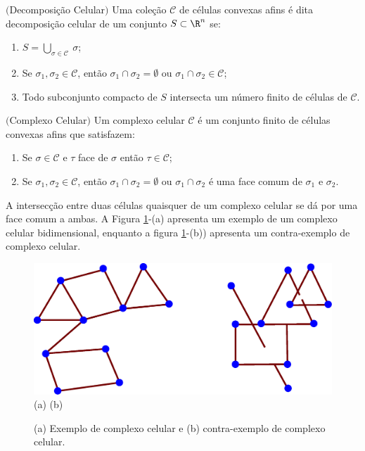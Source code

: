 \begin{defi} $($Decomposição Celular$)$
Uma cole\c c\~ao $\mathcal{C}$ de c\'elulas convexas afins 
\'e dita decomposi\c c\~ao celular de um conjunto $S \subset  \R^{n}$ se:
\begin{enumerate}
\item $S = \bigcup_{\sigma \in \mathcal{C}}\ \sigma$;
\item Se $\sigma_{1},\sigma_{2} \in \mathcal{C}$, ent\~ao $\sigma_{1} \cap \sigma_{2} = 
         \emptyset$ ou $\sigma_{1} \cap \sigma_{2} \in \mathcal{C}$;
\item Todo subconjunto compacto de $S$ intersecta um n\'umero finito de
      c\'elulas de $\mathcal{C}$. 
\end{enumerate}
\end{defi}

\begin{defi} $($Complexo Celular$)$
Um complexo celular $\mathcal{C}$ é um conjunto finito de células convexas afins que satisfazem: 
\begin{enumerate}
\item Se $\sigma \in \mathcal{C}$ e $\tau$ face de $\sigma$ então $\tau \in \mathcal{C}$;
\item Se $\sigma_{1},\sigma_{2} \in \mathcal{C}$, ent\~ao $\sigma_{1} \cap \sigma_{2} = \emptyset$ ou $\sigma_{1} \cap \sigma_{2}$ é uma face comum de $\sigma_1$ e $\sigma_2$.
\end{enumerate}
\label{complexocelular}
\end{defi}

A intersecção entre duas células quaisquer de um complexo celular se dá por uma face comum a ambas.  A Figura \ref{fig.celula}-(a) apresenta um exemplo de um complexo celular bidimensional, enquanto a figura \ref{fig.celula}-(b)) apresenta um contra-exemplo de complexo celular. 


\begin{figure}[h]
\begin{center} 
\includegraphics[angle=0,scale=0.3]{imagens/cap2/fig1.eps} \\
(a) \hspace{5.0cm} (b)\\
\caption{(a) Exemplo de complexo celular e (b) contra-exemplo de complexo celular.} 
\label{fig.celula}
\end{center}
\end{figure}


